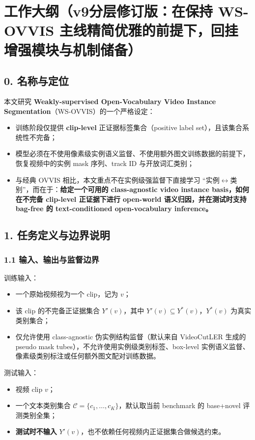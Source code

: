 \documentclass[UTF8]{ctexart}
\begin{document}
\section*{工作大纲（v9分层修订版：在保持 WS-OVVIS 主线精简优雅的前提下，回挂增强模块与机制储备）}

\subsection*{0. 名称与定位}
本文研究 \textbf{Weakly-supervised Open-Vocabulary Video Instance Segmentation}（WS-OVVIS）的一个严格设定：
\begin{itemize}
\item 训练阶段仅提供 \textbf{clip-level} 正证据标签集合（positive label set），且该集合系统性不完备；
\item 模型必须在不使用像素级实例语义监督、不使用额外图文训练数据的前提下，恢复视频中的实例 mask 序列、track ID 与开放词汇类别；
\item 与经典 OVVIS 相比，本文重点不在实例级强监督下直接学习 ``实例$\leftrightarrow$类别''，而在于：\textbf{给定一个可用的 class-agnostic video instance basis，如何在不完备 clip-level 正证据下进行 open-world 语义归因，并在测试时支持 bag-free 的 text-conditioned open-vocabulary inference。}
\end{itemize}

\par\noindent\hrulefill\par

\subsection*{1. 任务定义与边界说明}

\subsubsection*{1.1 输入、输出与监督边界}
训练输入：
\begin{itemize}
\item 一个原始视频视为一个 clip，记为 $v$；
\item 该 clip 的不完备正证据集合 $Y'(v)$，其中 $Y'(v)\subseteq Y^*(v)$，$Y^*(v)$ 为真实类别集合；
\item 仅允许使用 class-agnostic 伪实例结构监督（默认来自 VideoCutLER 生成的 pseudo mask tubes），不允许使用实例级类别标签、box-level 实例语义监督、像素级类别标注或任何额外图文配对训练数据。
\end{itemize}

测试输入：
\begin{itemize}
\item 视频 clip $v$；
\item 一个文本类别集合 $\mathcal C = \{c_1,\dots,c_K\}$，默认取当前 benchmark 的 base+novel 评测类别全集；
\item \textbf{测试时不输入} $Y'(v)$，也不依赖任何视频内正证据集合做候选约束。
\end{itemize}
\end{document}
